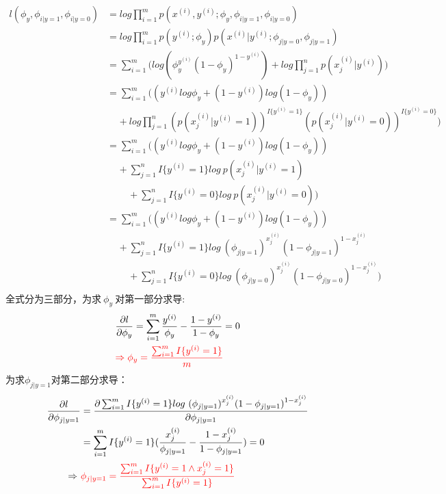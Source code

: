 \begin{equation}\nonumber
\begin{split}
  l(\phi_y,\phi_{i|y=1},\phi_{i|y=0})&=log\prod_{i=1}^{m}p(x^{(i)},y^{(i)};\phi_y,\phi_{i|y=1},\phi_{i|y=0})\\
                                     &=log\prod_{i=1}^{m}p(y^{(i)};\phi_y)p(x^{(i)}|y^{(i)};\phi_{j|y=0},\phi_{j|y=1})\\
                                     &=\sum_{i=1}^{m}\Big(log(\phi_y^{y^{(i)}}(1-\phi_y)^{1-y^{(i)}})+log\prod_{j=1}^{n}p(x_j^{(i)}|y^{(i)})\Big)\\
                                     &=\sum_{i=1}^{m}\Big((y^{(i)}log\phi_y+(1-y^{(i)})log(1-\phi_y))\\
                                     &~~~~~+log\prod_{j=1}^{n}(p(x_j^{(i)}|y^{(i)}=1))^{I\{y^{(i)}=1\}}(p(x_j^{(i)}|y^{(i)}=0))^{I\{y^{(i)}=0\}}\Big)\\
                                     &=\sum_{i=1}^{m}\Big((y^{(i)}log\phi_y+(1-y^{(i)})log(1-\phi_y))\\
                                     &~~~~~+\sum_{j=1}^{n}I\{y^{(i)}=1\}log~p(x_j^{(i)}|y^{(i)}=1)\\
                                     &~~~~~~~~~~+\sum_{j=1}^{n}I\{y^{(i)}=0\}log~p(x_j^{(i)}|y^{(i)}=0)\Big)\\
                                     &=\sum_{i=1}^{m}\Big((y^{(i)}log\phi_y+(1-y^{(i)})log(1-\phi_y))\\
                                     &~~~~~+\sum_{j=1}^{n}I\{y^{(i)}=1\}log~(\phi_{j|y=1})^{x_j^{(i)}}(1-\phi_{j|y=1})^{1-x_j^{(i)}}\\
                                     &~~~~~~~~~~+\sum_{j=1}^{n}I\{y^{(i)}=0\}log~(\phi_{j|y=0})^{x_j^{(i)}}(1-\phi_{j|y=0})^{1-x_j^{(i)}}\Big)\\
\end{split}
\end{equation}
全式分为三部分，为求$~\phi_y~$对第一部分求导:
\begin{equation}\nonumber
\begin{split}
  &\frac{\partial l}{\partial \phi_y}=\sum_{i=1}^{m}\frac{y^{(i)}}{\phi_y}-\frac{1-y^{(i)}}{1-\phi_y} =0\\
  &{\color{red}{\Rightarrow\phi_y = \frac{\sum_{i=1}^{m}I\{y^{(i)}=1\}}{m}}}\\
\end{split}
\end{equation}
为求$\phi_{j|y=1}$对第二部分求导：
\begin{equation}\nonumber
\begin{split}
  \frac{\partial l}{\partial \phi_{j|y=1}}&= \frac{\partial \sum_{i=1}^{m}I\{y^{(i)}=1\}log~(\phi_{j|y=1})^{x_j^{(i)}}(1-\phi_{j|y=1})^{1-x_j^{(i)}}}{\partial \phi_{j|y=1}}\\
  &=\sum_{i=1}^{m}I\{y^{(i)}=1\}(\frac{x_j^{(i)}}{\phi_{j|y=1}}-\frac{1-x_j^{(i)}}{1-\phi_{j|y=1}})=0\\
  \Rightarrow~&{\color{red}{\phi_{j|y=1}=\frac{\sum_{i=1}^{m}I\{y^{(i)}=1\wedge x_j^{(i)}=1\}}  {\sum_{i=1}^{m}I\{y^{(i)}=1\}}}}\\
\end{split}
\end{equation}
